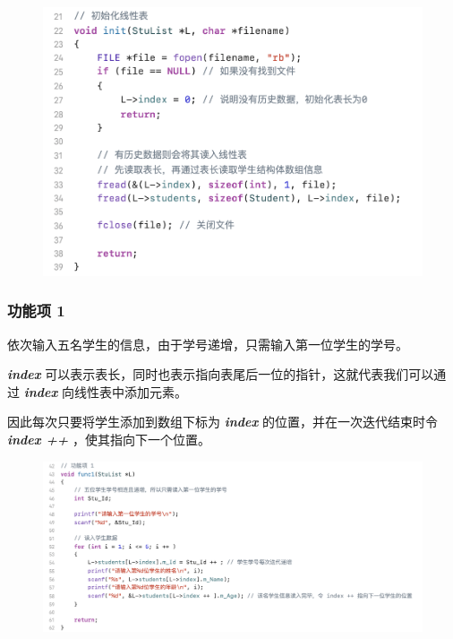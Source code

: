 \begin{enumerate}
                        \begin{figure}[htbp]
                            \includegraphics*[width = 14cm]{work1_s3.png}
                        \end{figure}
                \end{enumerate}
            \subsubsection*{功能项 1}
                \par 依次输入五名学生的信息，由于学号递增，只需输入第一位学生的学号。
                \par \textbf{\textit{index}} 可以表示表长，同时也表示指向表尾后一位的指针，这就代表我们可以通过 \textbf{\textit{index}} 向线性表中添加元素。
                \par 因此每次只要将学生添加到数组下标为 \textbf{\textit{index}} 的位置，并在一次迭代结束时令 \textbf{\textit{index ++ }}，使其指向下一个位置。
                \begin{figure}[htbp]
                    \includegraphics*[width = 17cm]{work1_s4.png}
                \end{figure}
            \newpage
